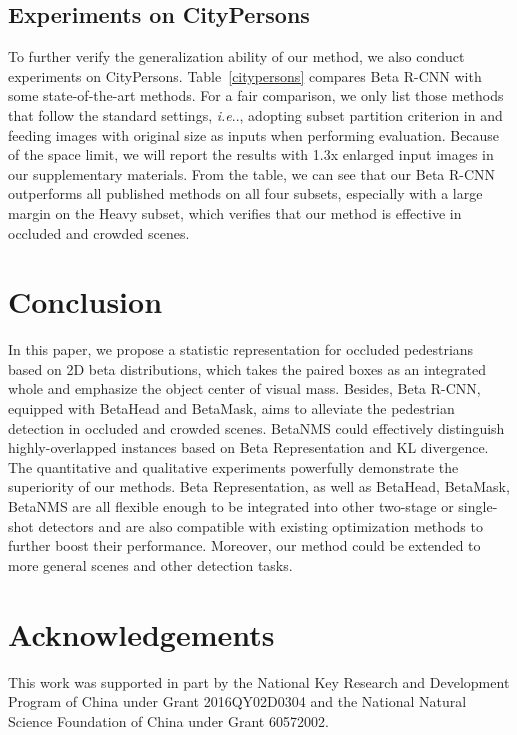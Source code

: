\documentclass{article}
\makeatletter
\DeclareRobustCommand\onedot{\futurelet\@let@token\@onedot}
\def\@onedot{\ifx\@let@token.\else.\null\fi\xspace}
\def\ie{\emph{i.e}\onedot} \def\Ie{\emph{I.e}\onedot}
\makeatother
\begin{document}
\subsection{Experiments on CityPersons}
To further verify the generalization ability of our method, we also conduct experiments on CityPersons.
Table~\ref{citypersons} compares Beta R-CNN with some state-of-the-art methods.
For a fair comparison, we only list those methods that follow the standard settings, \ie, adopting subset partition criterion in \cite{RepLoss} and feeding images with original size as inputs when performing evaluation. Because of the space limit, we will report the results with 1.3x enlarged input images in our supplementary materials.
From the table, we can see that our Beta R-CNN outperforms all published methods on all four subsets, especially with a large margin on the Heavy subset, which verifies that our method is effective in occluded and crowded scenes.






\section{Conclusion}
In this paper, we propose a statistic representation for occluded pedestrians based on 2D beta distributions, which takes the paired boxes as an integrated whole and emphasize the object center of visual mass.
Besides, Beta R-CNN, equipped with BetaHead and BetaMask, aims to alleviate the pedestrian detection in occluded and crowded scenes.
BetaNMS could effectively distinguish highly-overlapped instances based on Beta Representation and KL divergence.
The quantitative and qualitative experiments powerfully demonstrate the superiority of our methods.
Beta Representation, as well as BetaHead, BetaMask, BetaNMS are all flexible enough to be integrated into other two-stage or single-shot detectors and are also compatible with existing optimization methods to further boost their performance.
Moreover, our method could be extended to more general scenes and other detection tasks.



\section*{Acknowledgements}
This work was supported in part by the National Key Research and Development Program of China under Grant 2016QY02D0304 and the National Natural Science Foundation of China under Grant 60572002.
\end{document}
